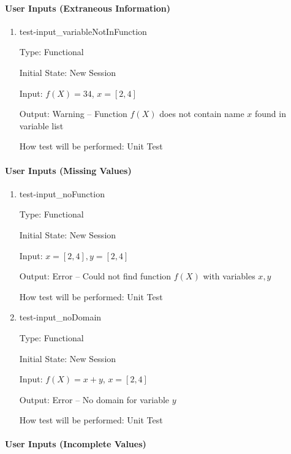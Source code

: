 \documentclass[12pt, titlepage]{article}
\begin{document}
\paragraph{User Inputs (Extraneous Information)}
	
\begin{enumerate}
	\item{test-input\_variableNotInFunction}
	
	Type: Functional
	
	Initial State: New Session
	
	Input: $f(X) = 34$, $x = [2,4]$
	
	Output: Warning -- Function $f(X)$ does not contain name $x$ found in 
	variable list
	
	How test will be performed: Unit Test\\
	
\end{enumerate}
		
\paragraph{User Inputs (Missing Values)}

\begin{enumerate}

\item{test-input\_noFunction}

Type: Functional

Initial State: New Session

Input: $x = [2,4], y = [2,4]$

Output: Error -- Could not find function $f(X)$ with variables $x, y$

How test will be performed: Unit Test\\

\item{test-input\_noDomain}

Type: Functional
					
Initial State: New Session
					
Input: $f(X) = x + y$, $x = [2,4]$
					
Output: Error -- No domain for variable $y$
					
How test will be performed: Unit Test\\

\end{enumerate}

\paragraph{User Inputs (Incomplete Values)}
\end{document}

